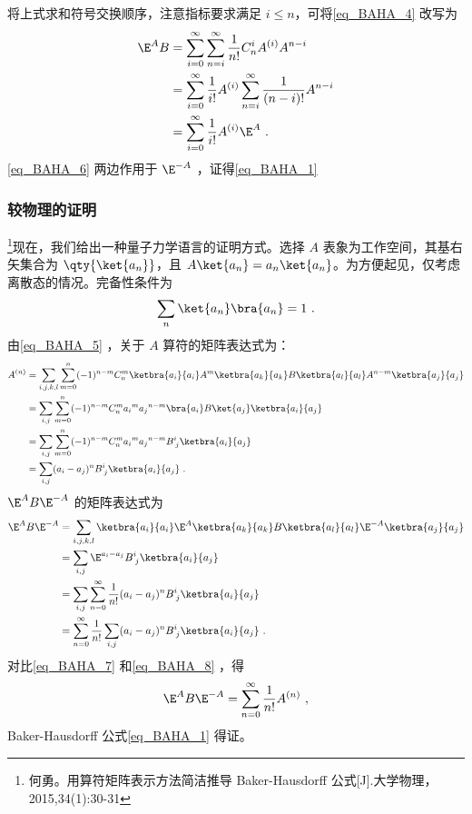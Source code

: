 将上式求和符号交换顺序，注意指标要求满足 $i\leq n$，可将\autoref{eq_BAHA_4} 改写为
\begin{equation}\label{eq_BAHA_6}
\begin{aligned}
\E^A B&=\sum_{i=0}^{\infty}\sum_{n=i}^{\infty}\frac{1}{n!}C_{n}^iA^{(i)}A^{n-i}\\
&=\sum_{i=0}^{\infty}\frac{1}{i!}A^{(i)}\sum_{n=i}^{\infty}\frac{1}{(n-i)!}A^{n-i}\\
&=\sum_{i=0}^{\infty}\frac{1}{i!}A^{(i)}\E^A~.
\end{aligned}
\end{equation}
\autoref{eq_BAHA_6} 两边作用于 $\E^{-A}$ ，证得\autoref{eq_BAHA_1} 

\subsubsection{较物理的证明}
\footnote{何勇。用算符矩阵表示方法简洁推导 Baker-Hausdorff 公式[J].大学物理，2015,34(1):30-31}现在，我们给出一种量子力学语言的证明方式。选择 $A$ 表象为工作空间，其基右矢集合为 $\qty{\ket{a_n}}$，且 $A\ket{a_n}=a_n\ket{a_n}$。为方便起见，仅考虑离散态的情况。完备性条件为
\begin{equation}
\sum_{n}\ket{a_n}\bra{a_n}=1~.
\end{equation}
由\autoref{eq_BAHA_5} ，关于 $A$ 算符的矩阵表达式为：
\begin{equation}\label{eq_BAHA_7}
\begin{aligned}
A^{(n)}&=\sum_{i,j,k,l}\sum_{m=0}^{n}(-1)^{n-m}C_{n}^{m}\ketbra{a_i}{a_i}A^m\ketbra{a_k}{a_k}B\ketbra{a_l}{a_l}A^{n-m}\ketbra{a_j}{a_j}\\
&=\sum_{i,j}\sum_{m=0}^{n}(-1)^{n-m}C_n^m{a_i}^m{a_j}^{n-m}\bra{a_i}B\ket{a_j}\ketbra{a_i}{a_j}\\
&=\sum_{i,j}\sum_{m=0}^{n}(-1)^{n-m}C_n^m{a_i}^m{a_j}^{n-m}B^i_{\; j}\ketbra{a_i}{a_j}\\
&=\sum_{i,j}(a_i-a_j)^nB^i_{\; j}\ketbra{a_i}{a_j}~.
\end{aligned}
\end{equation}
$\E^{A}B\E^{-A}$ 的矩阵表达式为
\begin{equation}\label{eq_BAHA_8}
\begin{aligned}
\E^{A}B\E^{-A}&=\sum_{i,j,k,l}\ketbra{a_i}{a_i}\E^{A}\ketbra{a_k}{a_k}B\ketbra{a_l}{a_l}\E^{-A}\ketbra{a_j}{a_j}\\
&=\sum_{i,j}\E^{a_i-a_j}B^{i}_{\;j}\ketbra{a_i}{a_j}\\
&=\sum_{i,j}\sum_{n=0}^{\infty}\frac{1}{n!}(a_i-a_j)^nB^{i}_{\;j}\ketbra{a_i}{a_j}\\
&=\sum_{n=0}^{\infty}\frac{1}{n!}\sum_{i,j}(a_i-a_j)^nB^{i}_{\;j}\ketbra{a_i}{a_j}~.
\end{aligned}
\end{equation}
对比\autoref{eq_BAHA_7} 和\autoref{eq_BAHA_8} ，得
\begin{equation}
\E^{A}B\E^{-A}=\sum_{n=0}^{\infty}\frac{1}{n!}A^{(n)}~,
\end{equation}
Baker-Hausdorff 公式\autoref{eq_BAHA_1} 得证。

